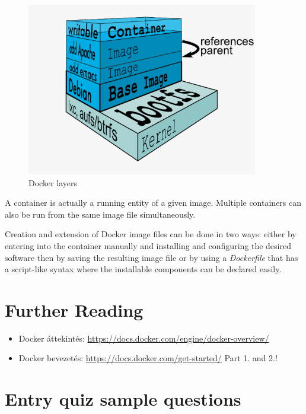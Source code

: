 \documentclass[a4paper]{article}
\begin{document}
\begin{figure}[H]
    \centering
    \includegraphics[width=0.9\textwidth]{figures/docker_layers.png}
    \caption{Docker layers}
    \label{fig:layers}
\end{figure}

A container is actually a running entity of a given image. Multiple containers can also be run from the same image file
simultaneously.

Creation and extension of Docker image files can be done in two ways: either by entering into the container manually
and installing and configuring the desired software then by saving the resulting image file or by using a
\emph{Dockerfile} that has a script-like syntax where the
installable components can be declared easily.

\section{Further Reading}

\begin{itemize}
    \item Docker áttekintés: \url{https://docs.docker.com/engine/docker-overview/}
    \item Docker bevezetés: \url{https://docs.docker.com/get-started/} Part 1. and 2.!
\end{itemize}

\appendix

\section{Entry quiz sample questions}
\end{document}
